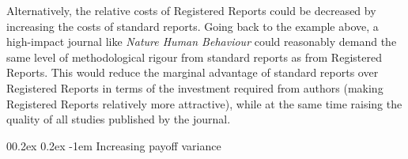 \documentclass[
  ,man,mask,floatsintext]{apa6}
\makeatletter
\let\oldparagraph\paragraph
\renewcommand{\paragraph}[1]{\oldparagraph{#1}\mbox{}}
\renewcommand{\paragraph}{\@startsection{paragraph}{4}{\parindent}%
  {0\baselineskip \@plus 0.2ex \@minus 0.2ex}%
  {-1em}%
  {\normalfont\normalsize\bfseries\itshape\typesectitle}}
\makeatother
\begin{document}
Alternatively, the relative costs of Registered Reports could be decreased by increasing the costs of standard reports.
Going back to the example above, a high-impact journal like \emph{Nature Human Behaviour} could reasonably demand the same level of methodological rigour
from standard reports as from Registered Reports.
This
would reduce the marginal advantage of standard reports over Registered Reports in terms of the investment required from authors (making Registered Reports relatively more attractive), while at the same time raising the quality of all studies published by the journal.

\par\vspace{0.4\baselineskip}

\hypertarget{increasing-payoff-variance}{%
\paragraph{Increasing payoff variance}\label{increasing-payoff-variance}}
\end{document}
